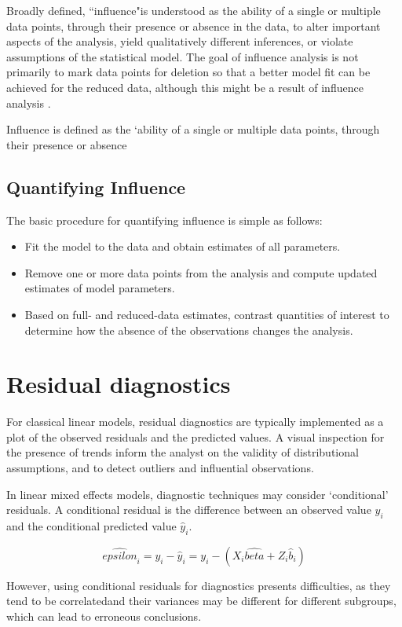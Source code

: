 \documentclass[12pt, a4paper]{report}
\theoremstyle{plain}
\theoremstyle{definition}
\theoremstyle{remark}
\begin{document}
Broadly defined, ``influence"is understood as the ability of a single or multiple data points, through their presence
or absence in the data, to alter important aspects of the analysis, yield qualitatively different inferences, or
violate assumptions of the statistical model. The goal of influence analysis is not primarily to mark data
points for deletion so that a better model fit can be achieved for the reduced data, although this might be a
result of influence analysis \citep{schabenberger}.

Influence is defined as the `ability of a single or multiple data points, through their presence or absence
\subsection{Quantifying Influence}  %

The basic procedure for quantifying influence is simple as follows:
\begin{itemize}
\item Fit the model to the data and obtain estimates of all parameters.
\item Remove one or more data points from the analysis and compute updated estimates of model parameters.
\item Based on full- and reduced-data estimates, contrast quantities of interest to determine how the absence
of the observations changes the analysis.
\end{itemize}
\newpage
\section{Residual diagnostics} %
For classical linear models, residual diagnostics are typically implemented as a plot of the observed residuals and the predicted values. A visual inspection for the presence of trends inform the analyst on the validity of distributional assumptions, and to detect outliers and influential observations.

In linear mixed effects models, diagnostic techniques may consider `conditional' residuals. A conditional residual is the difference between an observed value $y_{i}$ and the conditional predicted value $\hat{y}_{i} $.

\[ \hat{epsilon}_{i} = y_{i} - \hat{y}_{i} = y_{i} - ( X_{i}\hat{beta} + Z_{i}\hat{b}_{i}) \]

However, using conditional residuals for diagnostics presents difficulties, as they tend to be correlatedand their variances may be different for different subgroups, which can lead to erroneous conclusions.
\end{document}
